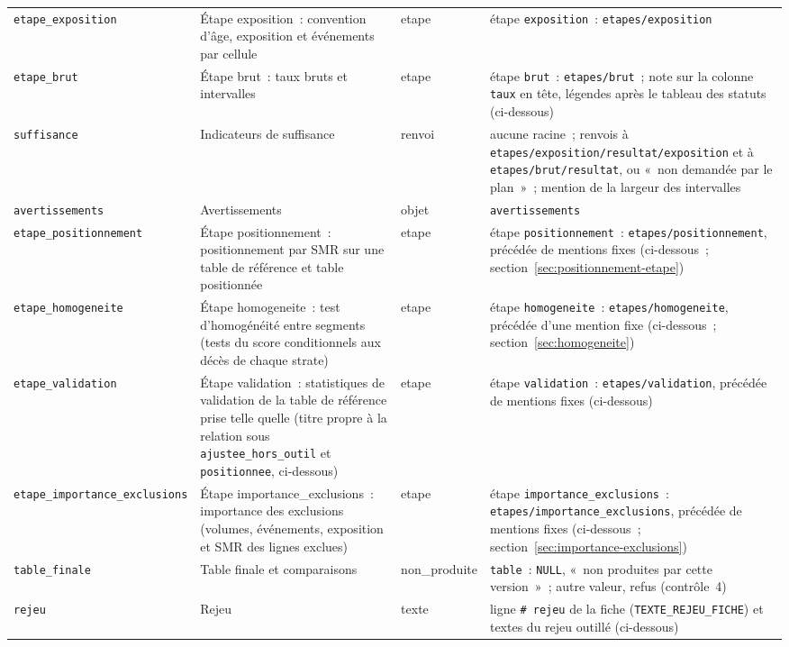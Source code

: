 \documentclass[a4paper,11pt]{article}
\newcommand{\code}[1]{\texttt{\small #1}}
\begin{document}
{\begin{longtable}{@{}p{3.1cm}p{4.2cm}p{2.0cm}p{5.3cm}@{}}
\code{etape\_exposition} & Étape exposition~: convention d'âge, exposition et événements par cellule & etape & étape \code{exposition}~: \code{etapes/exposition} \\
\code{etape\_brut} & Étape brut~: taux bruts et intervalles & etape & étape \code{brut}~: \code{etapes/brut}~; note sur la colonne \code{taux} en tête, légendes après le tableau des statuts (ci-dessous) \\
\code{suffisance} & Indicateurs de suffisance & renvoi & aucune racine~; renvois à \code{etapes/exposition/}\allowbreak\code{resultat/exposition} et à \code{etapes/brut/resultat}, ou «~non demandée par le plan~»~; mention de la largeur des intervalles \\
\code{avertissements} & Avertissements & objet & \code{avertissements} \\
\code{etape\_}\allowbreak\code{positionnement} & Étape positionnement~: positionnement par SMR sur une table de référence et table positionnée & etape & étape \code{positionnement}~: \code{etapes/}\allowbreak\code{positionnement}, précédée de mentions fixes (ci-dessous~; section~\ref{sec:positionnement-etape}) \\
\code{etape\_}\allowbreak\code{homogeneite} & Étape homogeneite~: test d'homogénéité entre segments (tests du score conditionnels aux décès de chaque strate) & etape & étape \code{homogeneite}~: \code{etapes/homogeneite}, précédée d'une mention fixe (ci-dessous~; section~\ref{sec:homogeneite}) \\
\code{etape\_validation} & Étape validation~: statistiques de validation de la table de référence prise telle quelle (titre propre à la relation sous \code{ajustee\_hors\_outil} et \code{positionnee}, ci-dessous) & etape & étape \code{validation}~: \code{etapes/validation}, précédée de mentions fixes (ci-dessous) \\
\code{etape\_importance\_}\allowbreak\code{exclusions} & Étape importance\_exclusions~: importance des exclusions (volumes, événements, exposition et SMR des lignes exclues) & etape & étape \code{importance\_exclusions}~: \code{etapes/}\allowbreak\code{importance\_exclusions}, précédée de mentions fixes (ci-dessous~; section~\ref{sec:importance-exclusions}) \\
\code{table\_finale} & Table finale et comparaisons & non\_produite & \code{table}~: \code{NULL}, «~non produites par cette version~»~; autre valeur, refus (contrôle~4) \\
\code{rejeu} & Rejeu & texte & ligne \code{\# rejeu} de la fiche (\code{TEXTE\_REJEU\_FICHE}) et textes du rejeu outillé (ci-dessous) \\
\end{longtable}
}
\end{document}
